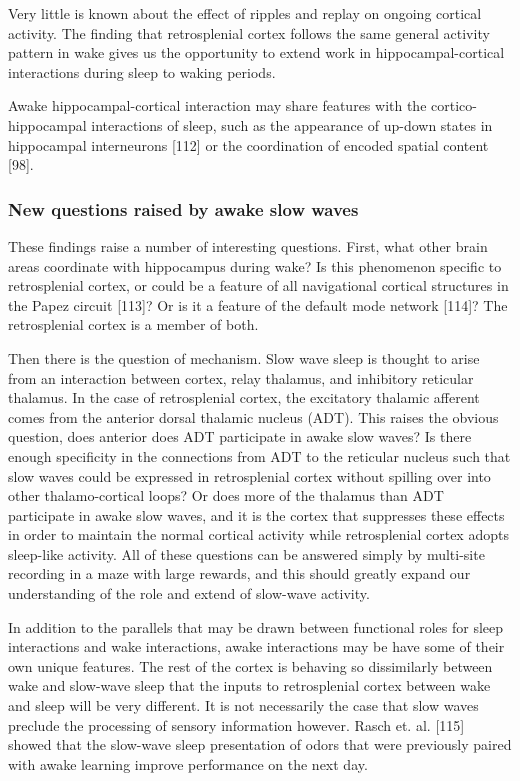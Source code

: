 \documentclass[]{article}
\begin{document}
Very little is known about the effect of ripples and replay on ongoing
cortical activity. The finding that retrosplenial cortex follows the
same general activity pattern in wake gives us the opportunity to extend
work in hippocampal-cortical interactions during sleep to waking
periods.

Awake hippocampal-cortical interaction may share features with the
cortico-hippocampal interactions of sleep, such as the appearance of
up-down states in hippocampal interneurons {[}112{]} or the coordination
of encoded spatial content {[}98{]}.

\subsubsection{New questions raised by awake slow waves}

These findings raise a number of interesting questions. First, what
other brain areas coordinate with hippocampus during wake? Is this
phenomenon specific to retrosplenial cortex, or could be a feature of
all navigational cortical structures in the Papez circuit {[}113{]}? Or
is it a feature of the default mode network {[}114{]}? The retrosplenial
cortex is a member of both.

Then there is the question of mechanism. Slow wave sleep is thought to
arise from an interaction between cortex, relay thalamus, and inhibitory
reticular thalamus. In the case of retrosplenial cortex, the excitatory
thalamic afferent comes from the anterior dorsal thalamic nucleus (ADT).
This raises the obvious question, does anterior does ADT participate in
awake slow waves? Is there enough specificity in the connections from
ADT to the reticular nucleus such that slow waves could be expressed in
retrosplenial cortex without spilling over into other thalamo-cortical
loops? Or does more of the thalamus than ADT participate in awake slow
waves, and it is the cortex that suppresses these effects in order to
maintain the normal cortical activity while retrosplenial cortex adopts
sleep-like activity. All of these questions can be answered simply by
multi-site recording in a maze with large rewards, and this should
greatly expand our understanding of the role and extend of slow-wave
activity.

In addition to the parallels that may be drawn between functional roles
for sleep interactions and wake interactions, awake interactions may be
have some of their own unique features. The rest of the cortex is
behaving so dissimilarly between wake and slow-wave sleep that the
inputs to retrosplenial cortex between wake and sleep will be very
different. It is not necessarily the case that slow waves preclude the
processing of sensory information however. Rasch et. al. {[}115{]}
showed that the slow-wave sleep presentation of odors that were
previously paired with awake learning improve performance on the next
day.
\end{document}
